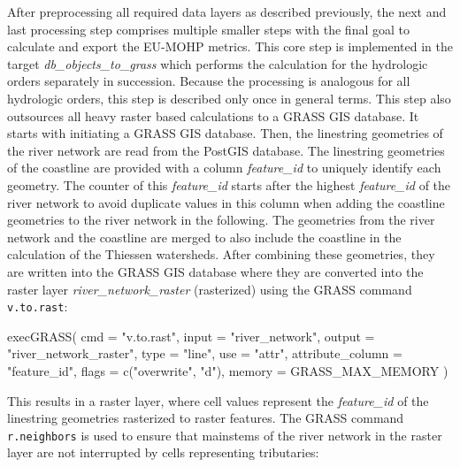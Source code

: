 \documentclass[fleqn,10pt]{wlscirep}
\newenvironment{Shaded}{\begin{snugshade}}{\end{snugshade}}
\newcommand{\AttributeTok}[1]{\textcolor[rgb]{0.77,0.63,0.00}{#1}}
\newcommand{\FunctionTok}[1]{\textcolor[rgb]{0.00,0.00,0.00}{#1}}
\newcommand{\NormalTok}[1]{#1}
\newcommand{\StringTok}[1]{\textcolor[rgb]{0.31,0.60,0.02}{#1}}
\begin{document}
After preprocessing all required data layers as described previously, the next and last processing step comprises multiple smaller steps with the final goal to calculate and export the EU-MOHP\cite{nolscher_eu-mohp_2021-1} metrics. This core step is implemented in the target \emph{db\_objects\_to\_grass} which performs the calculation for the hydrologic orders separately in succession. Because the processing is analogous for all hydrologic orders, this step is described only once in general terms. This step also outsources all heavy raster based calculations to a GRASS GIS database. It starts with initiating a GRASS GIS database. Then, the linestring geometries of the river network are read from the PostGIS database.
The linestring geometries of the coastline are provided with a column \emph{feature\_id} to uniquely identify each geometry. The counter of this \emph{feature\_id} starts after the highest \emph{feature\_id} of the river network to avoid duplicate values in this column when adding the coastline geometries to the river network in the following. The geometries from the river network and the coastline are merged to also include the coastline in the calculation of the Thiessen watersheds.
After combining these geometries, they are written into the GRASS GIS database where they are converted into the raster layer \emph{river\_network\_raster} (rasterized) using the GRASS command \texttt{v.to.rast}:

\small

\begin{Shaded}
\begin{Highlighting}[]
\FunctionTok{execGRASS}\NormalTok{(}
  \AttributeTok{cmd =} \StringTok{"v.to.rast"}\NormalTok{,}
  \AttributeTok{input =} \StringTok{"river\_network"}\NormalTok{,}
  \AttributeTok{output =} \StringTok{"river\_network\_raster"}\NormalTok{,}
  \AttributeTok{type =} \StringTok{"line"}\NormalTok{,}
  \AttributeTok{use =} \StringTok{"attr"}\NormalTok{,}
  \AttributeTok{attribute\_column =} \StringTok{"feature\_id"}\NormalTok{,}
  \AttributeTok{flags =} \FunctionTok{c}\NormalTok{(}\StringTok{"overwrite"}\NormalTok{, }\StringTok{"d"}\NormalTok{),}
  \AttributeTok{memory =}\NormalTok{ GRASS\_MAX\_MEMORY}
\NormalTok{)}
\end{Highlighting}
\end{Shaded}

\normalsize

This results in a raster layer, where cell values represent the \emph{feature\_id} of the linestring geometries rasterized to raster features.
The GRASS command \texttt{r.neighbors} is used to ensure that mainstems of the river network in the raster layer are not interrupted by cells representing tributaries:
\end{document}
